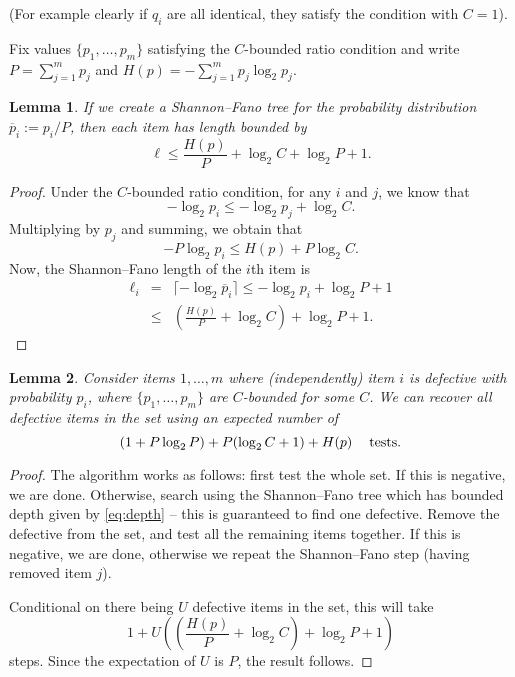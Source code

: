\documentclass[11pt]{article}
\newtheorem{lem}{Lemma}[section]
\newcommand{\ol}[1]{\overline{#1}}
\begin{document}
(For example clearly if \(q_i\) are all identical, they satisfy the condition with \(C=1\)).

Fix values \(\{ p_1, \ldots, p_m\}\) satisfying the $C$-bounded ratio condition and write $P = \sum_{j=1}^m p_j$ and $H(p) = -\sum_{j=1}^m p_j \log_2  p_j$.

\begin{lem}
If we create a Shannon--Fano tree for the probability distribution $\ol{p}_i := p_i/P$, then each item has length bounded by
\begin{equation} \label{eq:depth} \ell \leq \frac{H(p)}{P} + \log_2  C + \log_2  P + 1.\end{equation}
\end{lem}

\begin{proof} Under the $C$-bounded ratio condition, for any $i$ and $j$, we know that 
$$ -\log_2 p_i \leq - \log_2 p_j + \log_2 C.$$
Multiplying by $p_j$ and summing, we obtain that
$$ -P \log_2 p_i \leq H(p) + P \log_2 C.$$
Now, the Shannon--Fano length of the $i$th item is
\begin{eqnarray*}
 \ell_i & = & \lceil -\log_2 \ol{p}_i \rceil 
 \leq  -\log_2 p_i + \log_2 P + 1 \\
& \leq  & \left(\frac{H(p)}{P} + \log_2 C \right) + \log_2 P + 1.
\end{eqnarray*}
\end{proof}

\begin{lem} Consider items $1, \ldots, m$ where (independently) item $i$ is defective with probability $p_i$, where $\{ p_1, \ldots, p_m\}$ are $C$-bounded for some $C$.
We can recover  all defective items in the set using an expected number of
$$ (1 + P \log_2 P) + P (\log_2 C+1) + H(p) \mbox{ \;\; tests.} $$
\end{lem}
\begin{proof}
The algorithm works as follows: first test the whole set. If this is negative, we are done. Otherwise, search using the Shannon--Fano tree which has bounded depth given by
\eqref{eq:depth} -- this is guaranteed to find one defective. Remove the defective from the set, and test all the remaining items together. If this is negative, we are done, otherwise
we repeat the Shannon--Fano step (having removed item \(j\)).

Conditional on there being $U$ defective items in the set, this will take 
$$ 1 + U \left( \left(\frac{H(p)}{P} + \log_2 C \right) + \log_2 P + 1 \right)$$
steps. Since the expectation of $U$ is $P$, the result follows.
\end{proof}
\end{document}
